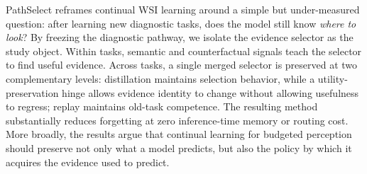 \documentclass{article}
\begin{document}
PathSelect reframes continual WSI learning around a simple but under-measured question: after learning new diagnostic tasks, does the model still know \emph{where to look}?
By freezing the diagnostic pathway, we isolate the evidence selector as the study object.
Within tasks, semantic and counterfactual signals teach the selector to find useful evidence.
Across tasks, a single merged selector is preserved at two complementary levels: distillation maintains selection behavior, while a utility-preservation hinge allows evidence identity to change without allowing usefulness to regress; replay maintains old-task competence.
The resulting method substantially reduces forgetting at zero inference-time memory or routing cost.
More broadly, the results argue that continual learning for budgeted perception should preserve not only what a model predicts, but also the policy by which it acquires the evidence used to predict.



\end{document}

